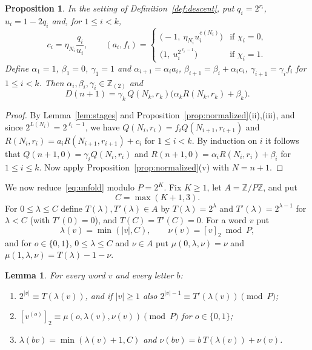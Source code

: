 \documentclass{amsart}
\newtheorem{proposition}[theorem]{Proposition}
\newtheorem{lemma}[theorem]{Lemma}
\theoremstyle{definition}
\theoremstyle{remark}
\numberwithin{equation}{section}
\newcommand{\Z}{\mathbb{Z}}
\newcommand{\Zt}{\mathbb{Z}_{(2)}}
\newcommand{\val}[1]{[#1]_2}
\begin{document}
\begin{proposition}\label{prop:unfold}
In the setting of Definition~\ref{def:descent}, put $q_i=2^{r_i}$, $u_i=1-2q_i$ and, for $1\le i<k$,
\[
c_i=\eta_{N_i}\frac{q_i}{u_i},\qquad
(a_i,f_i)=
\begin{cases}
\bigl(-1,\ \eta_{N_i}u_i^{e(N_i)}\bigr)&\text{if }\chi_i=0,\\
\bigl(1,\ u_i^{2^{\ell_i-1}}\bigr)&\text{if }\chi_i=1.
\end{cases}
\]
Define $\alpha_1=1$, $\beta_1=0$, $\gamma_1=1$ and $\alpha_{i+1}=\alpha_ia_i$, $\beta_{i+1}=\beta_i+\alpha_ic_i$, $\gamma_{i+1}=\gamma_if_i$ for $1\le i<k$. Then $\alpha_i,\beta_i,\gamma_i\in\Zt$ and
\begin{equation}\label{eq:unfold}
D(n+1)=\gamma_k\,Q(N_k,r_k)\bigl(\alpha_k R(N_k,r_k)+\beta_k\bigr).
\end{equation}
\end{proposition}

\begin{proof}
By Lemma~\ref{lem:stages} and Proposition~\ref{prop:normalized}(ii),(iii), and since $2^{L(N_i)}=2^{\ell_i-1}$, we have $Q(N_i,r_i)=f_iQ(N_{i+1},r_{i+1})$ and $R(N_i,r_i)=a_iR(N_{i+1},r_{i+1})+c_i$ for $1\le i<k$. By induction on $i$ it follows that $Q(n+1,0)=\gamma_iQ(N_i,r_i)$ and $R(n+1,0)=\alpha_iR(N_i,r_i)+\beta_i$ for $1\le i\le k$. Now apply Proposition~\ref{prop:normalized}(v) with $N=n+1$.
\end{proof}

We now reduce~\eqref{eq:unfold} modulo $P=2^K$. Fix $K\ge1$, let $A=\Z/P\Z$, and put
\[
C=\max(K+1,3).
\]
For $0\le\lambda\le C$ define $T(\lambda),T'(\lambda)\in A$ by $T(\lambda)=2^\lambda$ and $T'(\lambda)=2^{\lambda-1}$ for $\lambda<C$ (with $T'(0)=0$), and $T(C)=T'(C)=0$. For a word $v$ put
\[
\lambda(v)=\min(|v|,C),\qquad \nu(v)=\val{v}\bmod P,
\]
and for $o\in\{0,1\}$, $0\le\lambda\le C$ and $\nu\in A$ put $\mu(0,\lambda,\nu)=\nu$ and $\mu(1,\lambda,\nu)=T(\lambda)-1-\nu$.

\begin{lemma}\label{lem:suffixdata}
For every word $v$ and every letter $b$:
\begin{enumerate}
\item[(a)] $2^{|v|}\equiv T(\lambda(v))$, and if $|v|\ge1$ also $2^{|v|-1}\equiv T'(\lambda(v))\pmod P$;
\item[(b)] $\val{v^{(o)}}\equiv\mu(o,\lambda(v),\nu(v))\pmod P$ for $o\in\{0,1\}$;
\item[(c)] $\lambda(bv)=\min(\lambda(v)+1,C)$ and $\nu(bv)=b\,T(\lambda(v))+\nu(v)$.
\end{enumerate}
\end{lemma}
\end{document}
